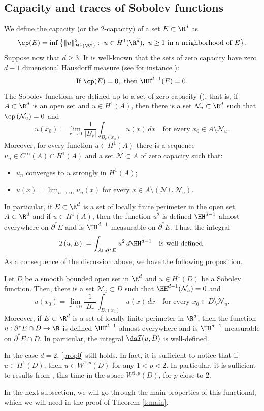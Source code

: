 \subsection{Capacity and traces of Sobolev functions}
We define the capacity (or the $2$-capacity) of a set $E\subset\R^d$ as
\[\cp (E)=\inf\big\{\|u\|_{H^1(\R^d)}^2:\ u\in H^1(\R^d),\ u\ge 1\ \text{in a neighborhood of}\ E\big\}.\]
Suppose now that $d\ge 3$. It is well-known that the sets of zero capacity have zero $d-1$ dimensional Hausdorff measure (see for instance \cite[\S 4.7.2, Th.\,4]{eg}):
\[\text{If } \cp(E)=0,\text{ then } \HH^{d-1}(E)=0.\]
The Sobolev functions are defined up to a set of zero capacity (), that is, if $A\subset \R^d$ is an open set and $u\in H^1(A)$, then there is a set $\mathcal N_u\subset\R^d$ such that $\cp\,(\mathcal N_u)=0$ and
\[u(x_0)=\lim_{r\to0}\frac1{|B_r|}\int_{B_r(x_0)}u(x)\,dx\quad\text{for every } x_0\in A\setminus \mathcal N_u.\]
Moreover, for every function $u\in H^1(A)$ there is a sequence $u_n\in C^\infty(A)\cap H^1(A)$ and a set $\mathcal N\subset A$ of zero capacity such that:
\begin{itemize}
\item $u_n$ converges to $u$ strongly in $H^1(A)$;
\item $u(x)=\lim_{n\to\infty}u_n(x)$ for every $x\in A\setminus(\mathcal N\cup\mathcal N_u)$.
\end{itemize}
In particular, if $E\subset\R^d$ is a set of locally finite perimeter in the open set $A\subset\R^d$ and if $u\in H^1(A)$, then the function $u^2$ is defined $\HH^{d-1}$-almost everywhere on $\partial^\ast E$ and is $\HH^{d-1}$ measurable on $\partial^\ast E$. Thus, the integral
\[\mathcal I(u,E):=\int_{A\cap \partial^\ast E}u^2\,d\HH^{d-1}\quad\text{is well-defined}.\]
As a consequence of the discussion above, we have the following proposition.
\begin{prop}\label{prop0}
Let $D$ be a smooth bounded open set in $\R^d$ and $u\in H^1(D)$ be a Sobolev function. Then, there is a set $\mathcal N_u\subset D$ such that $\HH^{d-1}(\mathcal N_u)=0$ and \[u(x_0)=\lim_{r\to0}\frac1{|B_r|}\int_{B_r(x_0)}u(x)\,dx\quad\text{for every } x_0\in D\setminus \mathcal N_u.\]
Moreover, if $E\subset\R^d$ is a set of locally finite perimeter in $\R^d$, then the function $u:\partial^\ast E\cap D\to\R$ is defined $\HH^{d-1}$-almost everywhere and is $\HH^{d-1}$-measurable on $\partial^\ast E\cap D$. In particular, the integral
$\ds \mathcal I(u,D)$ is well-defined.
\end{prop}
\begin{oss}
In the case $d=2$, \eqref{prop0} still holds. In fact, it is sufficient to notice that if $u\in H^1(D)$, then $u\in W^{1,p}(D)$ for any $1<p<2$. In particular, it is sufficient to results from \cite{eg}, this time in the space $W^{1,p}(D)$, for $p$ close to $2$.
\end{oss}
In the next subsection, we will go through the main properties of this functional, which we will need in the proof of Theorem \ref{t:main}.
